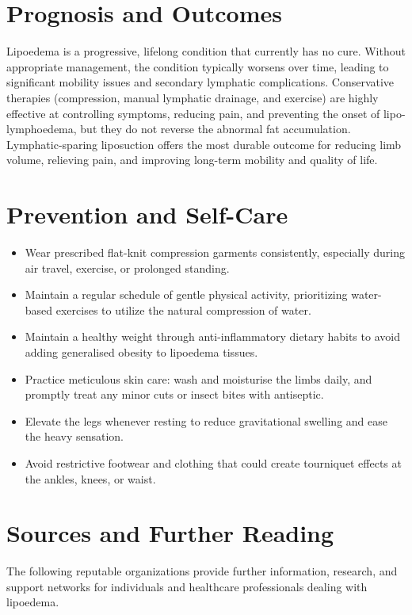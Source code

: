 \section*{Prognosis and Outcomes}
Lipoedema is a progressive, lifelong condition that currently has no cure. Without appropriate management, the condition typically worsens over time, leading to significant mobility issues and secondary lymphatic complications. Conservative therapies (compression, manual lymphatic drainage, and exercise) are highly effective at controlling symptoms, reducing pain, and preventing the onset of lipo-lymphoedema, but they do not reverse the abnormal fat accumulation. Lymphatic-sparing liposuction offers the most durable outcome for reducing limb volume, relieving pain, and improving long-term mobility and quality of life.

\section*{Prevention and Self-Care}
\begin{itemize}
    \item Wear prescribed flat-knit compression garments consistently, especially during air travel, exercise, or prolonged standing.
    \item Maintain a regular schedule of gentle physical activity, prioritizing water-based exercises to utilize the natural compression of water.
    \item Maintain a healthy weight through anti-inflammatory dietary habits to avoid adding generalised obesity to lipoedema tissues.
    \item Practice meticulous skin care: wash and moisturise the limbs daily, and promptly treat any minor cuts or insect bites with antiseptic.
    \item Elevate the legs whenever resting to reduce gravitational swelling and ease the heavy sensation.
    \item Avoid restrictive footwear and clothing that could create tourniquet effects at the ankles, knees, or waist.
\end{itemize}

\section*{Sources and Further Reading}
The following reputable organizations provide further information, research, and support networks for individuals and healthcare professionals dealing with lipoedema.

